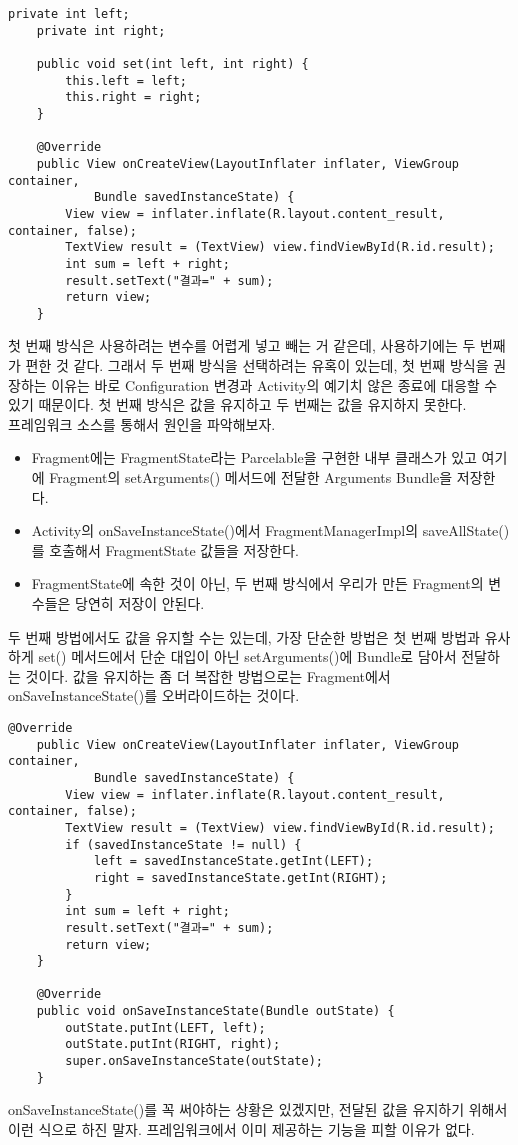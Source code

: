 \begin{lstlisting}[frame=single]
    private int left;
    private int right;

    public void set(int left, int right) {
        this.left = left;
        this.right = right;
    }

    @Override
    public View onCreateView(LayoutInflater inflater, ViewGroup container, 
    		Bundle savedInstanceState) {
        View view = inflater.inflate(R.layout.content_result, container, false);
        TextView result = (TextView) view.findViewById(R.id.result);
        int sum = left + right;
        result.setText("결과=" + sum);
        return view;
    }
\end{lstlisting}

첫 번째 방식은 사용하려는 변수를 어렵게 넣고 빼는 거 같은데, 사용하기에는 두 번째가 편한 것 같다.
그래서 두 번째 방식을 선택하려는 유혹이 있는데, 첫 번째 방식을 권장하는 이유는 바로 Configuration 변경과 Activity의 예기치 않은 종료에 대응할 수 있기 때문이다. 첫 번째 방식은 값을 유지하고 두 번째는 값을 유지하지 못한다.\\

프레임워크 소스를 통해서 원인을 파악해보자.
\begin{itemize}
\item Fragment에는 FragmentState라는 Parcelable을 구현한 내부 클래스가 있고 여기에 Fragment의 setArguments() 메서드에 전달한 Arguments Bundle을 저장한다.
\item Activity의 onSaveInstanceState()에서 FragmentManagerImpl의 saveAllState()를 호출해서 FragmentState 값들을 저장한다.
\item FragmentState에 속한 것이 아닌, 두 번째 방식에서 우리가 만든 Fragment의 변수들은 당연히 저장이 안된다.
\end{itemize}

두 번째 방법에서도 값을 유지할 수는 있는데, 가장 단순한 방법은 첫 번째 방법과 유사하게 set() 메서드에서 단순 대입이 아닌 setArguments()에 Bundle로 담아서 전달하는 것이다. 값을 유지하는 좀 더 복잡한 방법으로는 Fragment에서 onSaveInstanceState()를 오버라이드하는 것이다.
\begin{lstlisting}[frame=single]
    @Override
    public View onCreateView(LayoutInflater inflater, ViewGroup container, 
    		Bundle savedInstanceState) {
        View view = inflater.inflate(R.layout.content_result, container, false);
        TextView result = (TextView) view.findViewById(R.id.result);
        if (savedInstanceState != null) {
            left = savedInstanceState.getInt(LEFT);
            right = savedInstanceState.getInt(RIGHT);
        }
        int sum = left + right;
        result.setText("결과=" + sum);
        return view;
    }

    @Override
    public void onSaveInstanceState(Bundle outState) {
        outState.putInt(LEFT, left);
        outState.putInt(RIGHT, right);
        super.onSaveInstanceState(outState);
    }
\end{lstlisting}
onSaveInstanceState()를 꼭 써야하는 상황은 있겠지만, 전달된 값을 유지하기 위해서 이런 식으로 하진 말자. 프레임워크에서 이미 제공하는 기능을 피할 이유가 없다.\\

